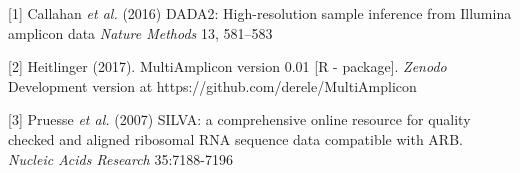 \documentclass[30pt, a0paper, portrait, margin=0mm, innermargin=15mm,
               blockverticalspace=15mm, colspace=15mm, subcolspace=8mm]{tikzposter}
\begin{document}
\begin{columns}
{\begin{small}
          \hangindent=2cm [1] Callahan \textit{et al.} (2016) DADA2:
          High-resolution sample inference from Illumina amplicon data
          \textit{Nature Methods} 13, 581--583

          \hangindent=2cm [2] Heitlinger (2017). MultiAmplicon version
          0.01 [R - package]. \textit{Zenodo} Development version at
          https://github.com/derele/MultiAmplicon

          \hangindent=2cm [3] Pruesse \textit{et al.} (2007) SILVA: a
          comprehensive online resource for quality checked and
          aligned ribosomal RNA sequence data compatible with
          ARB. \textit{Nucleic Acids Research} 35:7188-7196

          
        \end{small}
      }


\end{columns}

\end{document}
